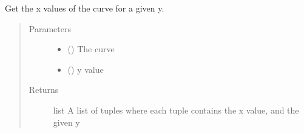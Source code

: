 \documentclass[letterpaper,10pt,english]{sphinxmanual}
\begin{document}
\begin{fulllineitems}
\label{\detokenize{pydv:pydvpy.getx}}
Get the x values of the curve for a given y.

\begin{sphinxVerbatim}[commandchars=\\\{\}]
  
\end{sphinxVerbatim}

\begin{sphinxVerbatim}[commandchars=\\\{\}]
  \PYG{p}{[}\PYG{p}{]} 
\end{sphinxVerbatim}

\begin{sphinxVerbatim}[commandchars=\\\{\}]
   \PYG{p}{[}\PYG{p}{]}
\end{sphinxVerbatim}
\begin{quote}\begin{description}
\item[{Parameters}] \leavevmode\begin{itemize}
\item {} 
 ({\hyperref[\detokenize{pydv:curve.Curve}]{}}) \textendash{} The curve

\item {} 
 () \textendash{} y value

\end{itemize}

\item[{Returns}] \leavevmode
list \textendash{} A list of tuples where each tuple contains the x value, and the given y

\end{description}\end{quote}

\end{fulllineitems}
\end{document}
